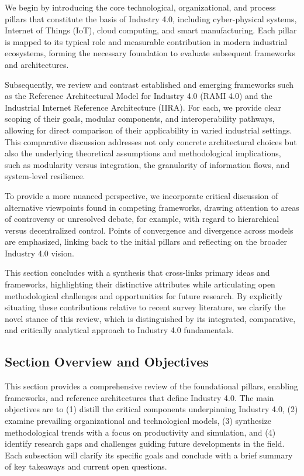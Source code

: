 \documentclass[sigconf]{acmart}
\begin{document}
We begin by introducing the core technological, organizational, and process pillars that constitute the basis of Industry 4.0, including cyber-physical systems, Internet of Things (IoT), cloud computing, and smart manufacturing. Each pillar is mapped to its typical role and measurable contribution in modern industrial ecosystems, forming the necessary foundation to evaluate subsequent frameworks and architectures.

Subsequently, we review and contrast established and emerging frameworks such as the Reference Architectural Model for Industry 4.0 (RAMI 4.0) and the Industrial Internet Reference Architecture (IIRA). For each, we provide clear scoping of their goals, modular components, and interoperability pathways, allowing for direct comparison of their applicability in varied industrial settings. This comparative discussion addresses not only concrete architectural choices but also the underlying theoretical assumptions and methodological implications, such as modularity versus integration, the granularity of information flows, and system-level resilience.

To provide a more nuanced perspective, we incorporate critical discussion of alternative viewpoints found in competing frameworks, drawing attention to areas of controversy or unresolved debate, for example, with regard to hierarchical versus decentralized control. Points of convergence and divergence across models are emphasized, linking back to the initial pillars and reflecting on the broader Industry 4.0 vision.

This section concludes with a synthesis that cross-links primary ideas and frameworks, highlighting their distinctive attributes while articulating open methodological challenges and opportunities for future research. By explicitly situating these contributions relative to recent survey literature, we clarify the novel stance of this review, which is distinguished by its integrated, comparative, and critically analytical approach to Industry 4.0 fundamentals.

\subsection*{Section Overview and Objectives}
This section provides a comprehensive review of the foundational pillars, enabling frameworks, and reference architectures that define Industry 4.0. The main objectives are to (1) distill the critical components underpinning Industry 4.0, (2) examine prevailing organizational and technological models, (3) synthesize methodological trends with a focus on productivity and simulation, and (4) identify research gaps and challenges guiding future developments in the field. Each subsection will clarify its specific goals and conclude with a brief summary of key takeaways and current open questions.
\end{document}
